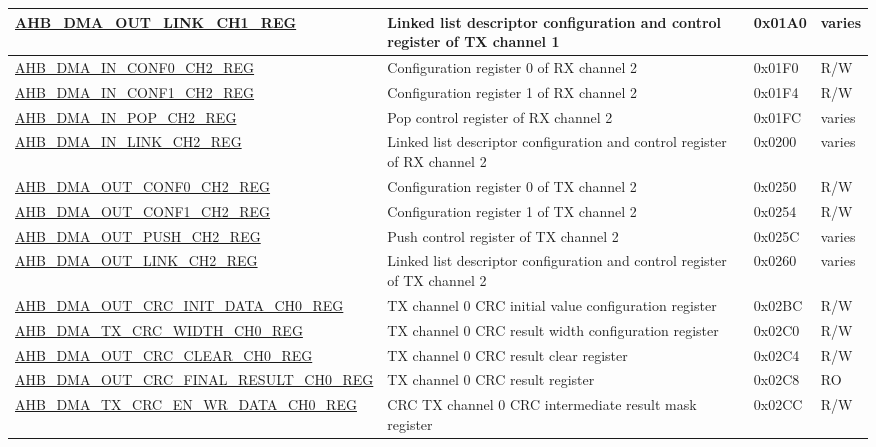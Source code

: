 \begin{longtable}{ | l | p{10cm} | p{1.3cm} | l | }
\hyperref[regdesc:AHBDMAOUTLINKCHNREG]{AHB\_DMA\_OUT\_LINK\_CH1\_REG} & Linked list descriptor configuration and control register of TX channel 1 & 0x01A0 & varies \\ \hline
\hyperref[regdesc:AHBDMAINCONF0CHNREG]{AHB\_DMA\_IN\_CONF0\_CH2\_REG} & Configuration register 0 of RX channel 2 & 0x01F0 & R/W \\ \hline
\hyperref[regdesc:AHBDMAINCONF1CHNREG]{AHB\_DMA\_IN\_CONF1\_CH2\_REG} & Configuration register 1 of RX channel 2 & 0x01F4 & R/W \\ \hline
\hyperref[regdesc:AHBDMAINPOPCHNREG]{AHB\_DMA\_IN\_POP\_CH2\_REG} & Pop control register of RX channel 2 & 0x01FC & varies \\ \hline
\hyperref[regdesc:AHBDMAINLINKCHNREG]{AHB\_DMA\_IN\_LINK\_CH2\_REG} & Linked list descriptor configuration and control register of RX channel 2 & 0x0200 & varies \\ \hline
\hyperref[regdesc:AHBDMAOUTCONF0CHNREG]{AHB\_DMA\_OUT\_CONF0\_CH2\_REG} & Configuration register 0 of TX channel 2 & 0x0250 & R/W \\ \hline
\hyperref[regdesc:AHBDMAOUTCONF1CHNREG]{AHB\_DMA\_OUT\_CONF1\_CH2\_REG} & Configuration register 1 of TX channel 2 & 0x0254 & R/W \\ \hline
\hyperref[regdesc:AHBDMAOUTPUSHCHNREG]{AHB\_DMA\_OUT\_PUSH\_CH2\_REG} & Push control register of TX channel 2 & 0x025C & varies \\ \hline
\hyperref[regdesc:AHBDMAOUTLINKCHNREG]{AHB\_DMA\_OUT\_LINK\_CH2\_REG} & Linked list descriptor configuration and control register of TX channel 2 & 0x0260 & varies \\ \hline
\hyperref[regdesc:AHBDMAOUTCRCINITDATACHNREG]{AHB\_DMA\_OUT\_CRC\_INIT\_DATA\_CH0\_REG} & TX channel 0 CRC initial value configuration register & 0x02BC & R/W \\ \hline
\hyperref[regdesc:AHBDMATXCRCWIDTHCHNREG]{AHB\_DMA\_TX\_CRC\_WIDTH\_CH0\_REG} & TX channel 0 CRC result width configuration register & 0x02C0 & R/W \\ \hline
\hyperref[regdesc:AHBDMAOUTCRCCLEARCHNREG]{AHB\_DMA\_OUT\_CRC\_CLEAR\_CH0\_REG} & TX channel 0 CRC result clear register & 0x02C4 & R/W \\ \hline
\hyperref[regdesc:AHBDMAOUTCRCFINALRESULTCHNREG]{AHB\_DMA\_OUT\_CRC\_FINAL\_RESULT\_CH0\_REG} & TX channel 0 CRC result register & 0x02C8 & RO \\ \hline
\hyperref[regdesc:AHBDMATXCRCENWRDATACHNREG]{AHB\_DMA\_TX\_CRC\_EN\_WR\_DATA\_CH0\_REG} & CRC TX channel 0 CRC intermediate result mask register & 0x02CC & R/W \\ \hline

\end{longtable}
